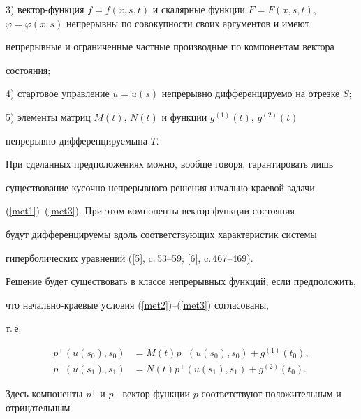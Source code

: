 3) вектор-функция $f=f(x,s,t)$ и скалярные функции $F=F(x,s,t)$, $\varphi=


\varphi (x,s)$ непрерывны по совокупности своих аргументов и имеют


непрерывные и ограниченные частные производные по компонентам вектора


состояния;





4) стартовое управление $u=u(s)$ непрерывно дифференцируемо на отрезке $S$;





5) элементы матриц $M(t)$, $N(t)$ и функции $g^{(1)}(t)$, $g^{(2)}(t)$ 


непрерывно дифференцируемы\linebreak на $T$.





При сделанных предположениях можно, вообще говоря, гарантировать лишь


существование кусочно-непрерывного решения начально-краевой задачи


(\ref{met1})--(\ref{met3}). При этом компоненты вектор-функции состояния


будут дифференцируемы вдоль соответствующих характеристик системы


гиперболических уравнений ([5], c.\,53--59; [6], c.\,467--469).





Решение будет существовать в классе непрерывных функций, если предположить, 


что начально-краевые условия (\ref{met2})--(\ref{met3}) согласованы,


т.\,е.


\begin{equation}


\begin{split}


p^+(u(s_0),s_0)&=M(t) p^-(u(s_0),s_0)+g^{(1)}(t_0),\\


p^-(u(s_1),s_1)&=N(t) p^+(u(s_1),s_1)+g^{(2)}(t_0).


\end{split}


\label{met7}


\end{equation}


Здесь компоненты $p^+$ и $p^-$ вектор-функции $p$ соответствуют положительным и отрицательным


